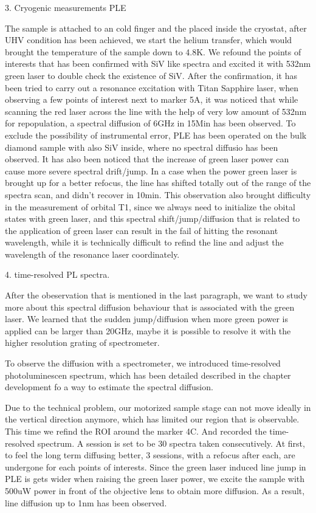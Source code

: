 3. Cryogenic measurements PLE
 
The sample is attached to an cold finger and the placed inside the cryostat, after UHV condition has been achieved, we start the helium transfer, which would brought the temperature of the sample down to 4.8K. We refound the points of interests that has been confirmed with SiV like spectra and excited it with 532nm green laser to double check the existence of SiV. After the confirmation, it has been tried to carry out a resonance excitation with Titan Sapphire laser, when observing a few points of interest next to marker 5A, it was noticed that while scanning the red laser across the line with the help of very low amount of 532nm for repopulation, a spectral diffusion of 6GHz in 15Min has been observed. To exclude the possibility of instrumental error, PLE has been operated on the bulk diamond sample with also SiV inside, where no spectral diffusio has been observed. It has also been noticed that the increase of green laser power can cause more severe spectral drift/jump. In a case when the power green laser is brought up for a better refocus, the line has shifted totally out of the range of the spectra scan, and didn't recover in 10min. This observation also brought difficulty in the measurement of orbital T1, since we always need to initialize the obital states with green laser, and this spectral shift/jump/diffusion that is related to the application of green laser can result in the fail of hitting the resonant wavelength, while it is technically difficult to refind the line and adjust the wavelength of the resonance laser coordinately. 

4. time-resolved PL spectra.

After the obeservation that is mentioned in the last paragraph, we want to study more about this spectral diffusion behaviour that is associated with the green laser. We learned that the sudden jump/diffusion when more green power is applied can be larger than 20GHz, maybe it is possible to resolve it with the higher resolution grating of spectrometer. 

To observe the diffusion with a spectrometer, we introduced time-resolved photoluminescen spectrum, which has been detailed described in the chapter development fo a way to estimate the spectral diffusion.

Due to the technical problem, our motorized sample stage can not move ideally in the vertical direction anymore, which has limited our region that is observable. This time we refind the ROI around the marker 4C. And recorded the time-resolved spectrum. A session is set to be 30 spectra taken consecutively. At first, to feel the long term diffusing better, 3 sessions, with a refocus after each, are undergone for each points of interests. Since the green laser induced line jump in PLE is gets wider when raising the green laser power, we excite the sample with 500uW power in front of the objective lens to obtain more diffusion. As a result, line diffusion up to 1nm has been observed.

